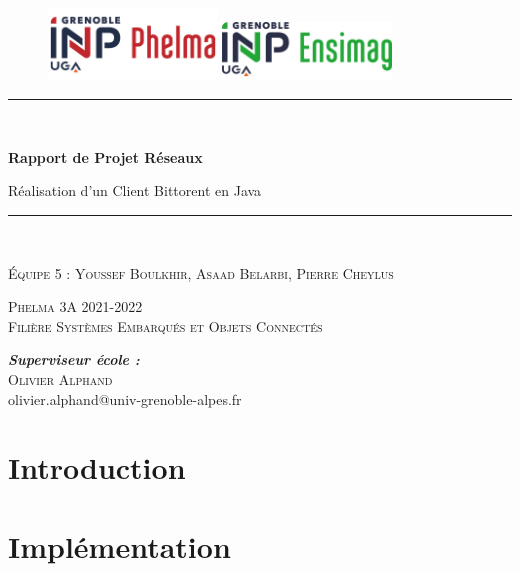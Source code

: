 \documentclass{article}
\begin{document}
\begin{titlepage}

\centering
\begin{figure}
   \includegraphics[width=0.4\textwidth]{logophelma.jpg}
   \hfill
   \includegraphics[width=0.4\textwidth]{logoimag.png}
\end{figure}

\rule{\linewidth}{0.2 mm} \\[0.4 cm]
{\huge\bfseries Rapport de Projet Réseaux \par\vspace{1cm}}
{\Large Réalisation d'un Client Bittorent en Java}
\rule{\linewidth}{0.2 mm} \\[1.0 cm]



{\scshape\Large
Équipe 5 : Youssef Boulkhir, Asaad Belarbi, Pierre Cheylus
\par}
\vspace{1cm}

{\scshape \Large Phelma 3A 2021-2022 \\
Filière Systèmes Embarqués et Objets Connectés \par}
\vspace{7cm}

\begin{flushleft}
\emph{\textbf{Superviseur école :}}\\
\textsc{Olivier Alphand} \\
olivier.alphand@univ-grenoble-alpes.fr\\
\end{flushleft}
\end{titlepage}
\newpage

\tableofcontents
\newpage

\section{Introduction}

\section{Implémentation}
\end{document}
